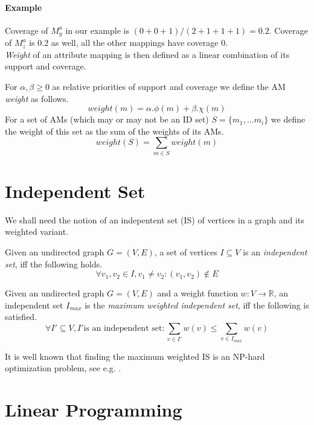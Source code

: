 \paragraph{Example}
Coverage of $M_{y}^{a}$ in our example is $(0+0+1) / (2+1+1+1) = 0.2$. Coverage of $M_{z}^{a}$ is $0.2$ as well, all the other mappings have coverage $0$.
\\

\textit{Weight} of an attribute mapping is then defined as a linear combination of its support and coverage.

\begin{define}[Weight]
For $\alpha, \beta \geq 0$ as relative priorities of support and coverage we define the AM \textit{weight} as follows.
\[weight(m) = \alpha . \phi(m) + \beta . \chi(m)\]
For a set of AMs (which may or may not be an ID set) $S = \{m_1, \ldots m_i\}$ we define the weight of this set as the sum of the weights of its AMs.
\[weight(S) = \sum_{m \in S} weight(m)\]
\end{define}

\section{Independent Set}
\label{section-definitions-is}


We shall need the notion of an indepentent set (IS) of vertices in a graph and its weighted variant.

\begin{define}
Given an undirected graph $G = (V, E)$, a set of vertices $I \subseteq V$ is an \textit{independent set}, iff the following holds.
\[\forall v_1, v_2 \in I, v_1 \neq v_2: (v_1, v_2) \notin E \]
\end{define}

\begin{define}
Given an undirected graph $G = (V, E)$ and a weight function $w: V \rightarrow \mathbb{R}$, an independent set $I_{max}$ is the \textit{maximum weighted independent set}, iff the following is satisfied.
\[\forall I' \subseteq V, I' \text{is an independent set}: \sum_{v \in I'} w(v) \leqslant \sum_{v \in I_{max}} w(v)\]
\end{define}

It is well known that finding the maximum weighted IS is an NP-hard optimization problem, see e.g. \cite{JM1986425}.

\section{Linear Programming}

